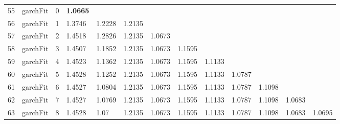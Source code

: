 \documentclass[10pt,a4paper]{article}
\begin{document}
\begin{table}[ht]
\begin{tabular}{rlrllllllllll}
   \hline
55 & garchFit &     0 & \textbf{1.0665} &  &  &  &  &  &  &  &  &  \\ 
  56 & garchFit &     1 & 1.3746 & 1.2228 & 1.2135 &  &  &  &  &  &  &  \\ 
  57 & garchFit &     2 & 1.4518 & 1.2826 & 1.2135 & 1.0673 &  &  &  &  &  &  \\ 
  58 & garchFit &     3 & 1.4507 & 1.1852 & 1.2135 & 1.0673 & 1.1595 &  &  &  &  &  \\ 
  59 & garchFit &     4 & 1.4523 & 1.1362 & 1.2135 & 1.0673 & 1.1595 & 1.1133 &  &  &  &  \\ 
  60 & garchFit &     5 & 1.4528 & 1.1252 & 1.2135 & 1.0673 & 1.1595 & 1.1133 & 1.0787 &  &  &  \\ 
  61 & garchFit &     6 & 1.4527 & 1.0804 & 1.2135 & 1.0673 & 1.1595 & 1.1133 & 1.0787 & 1.1098 &  &  \\ 
  62 & garchFit &     7 & 1.4527 & 1.0769 & 1.2135 & 1.0673 & 1.1595 & 1.1133 & 1.0787 & 1.1098 & 1.0683 &  \\ 
  63 & garchFit &     8 & 1.4528 & 1.07 & 1.2135 & 1.0673 & 1.1595 & 1.1133 & 1.0787 & 1.1098 & 1.0683 & 1.0695 \\ 
   \hline
\end{tabular}
\end{table}
\end{document}

